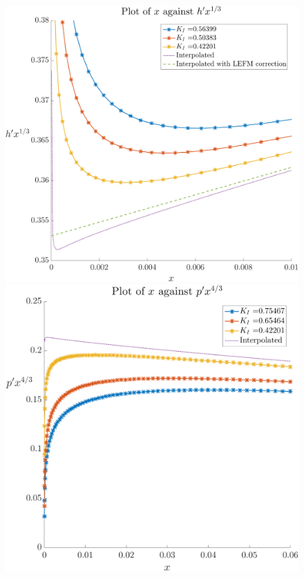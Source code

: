 \documentclass{article}
\begin{document}
%
\begin{figure}[!ht]\centering
\includegraphics[scale=0.50]{hprime-x.pdf}
\\[8pt]
\includegraphics[scale=0.50]{pprime-x.pdf}
\end{figure}
%
\end{document}
